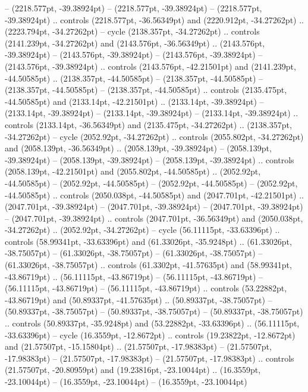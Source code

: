  -- (2218.577pt, -39.38924pt)
 -- (2218.577pt, -39.38924pt)
 -- (2218.577pt, -39.38924pt) .. controls (2218.577pt, -36.56349pt) and (2220.912pt, -34.27262pt) .. (2223.794pt, -34.27262pt) -- cycle
(2138.357pt, -34.27262pt) .. controls (2141.239pt, -34.27262pt) and (2143.576pt, -36.56349pt) .. (2143.576pt, -39.38924pt)
 -- (2143.576pt, -39.38924pt)
 -- (2143.576pt, -39.38924pt)
 -- (2143.576pt, -39.38924pt) .. controls (2143.576pt, -42.21501pt) and (2141.239pt, -44.50585pt) .. (2138.357pt, -44.50585pt)
 -- (2138.357pt, -44.50585pt)
 -- (2138.357pt, -44.50585pt)
 -- (2138.357pt, -44.50585pt) .. controls (2135.475pt, -44.50585pt) and (2133.14pt, -42.21501pt) .. (2133.14pt, -39.38924pt)
 -- (2133.14pt, -39.38924pt)
 -- (2133.14pt, -39.38924pt)
 -- (2133.14pt, -39.38924pt) .. controls (2133.14pt, -36.56349pt) and (2135.475pt, -34.27262pt) .. (2138.357pt, -34.27262pt) -- cycle
(2052.92pt, -34.27262pt) .. controls (2055.802pt, -34.27262pt) and (2058.139pt, -36.56349pt) .. (2058.139pt, -39.38924pt)
 -- (2058.139pt, -39.38924pt)
 -- (2058.139pt, -39.38924pt)
 -- (2058.139pt, -39.38924pt) .. controls (2058.139pt, -42.21501pt) and (2055.802pt, -44.50585pt) .. (2052.92pt, -44.50585pt)
 -- (2052.92pt, -44.50585pt)
 -- (2052.92pt, -44.50585pt)
 -- (2052.92pt, -44.50585pt) .. controls (2050.038pt, -44.50585pt) and (2047.701pt, -42.21501pt) .. (2047.701pt, -39.38924pt)
 -- (2047.701pt, -39.38924pt)
 -- (2047.701pt, -39.38924pt)
 -- (2047.701pt, -39.38924pt) .. controls (2047.701pt, -36.56349pt) and (2050.038pt, -34.27262pt) .. (2052.92pt, -34.27262pt) -- cycle
(56.11115pt, -33.63396pt) .. controls (58.99341pt, -33.63396pt) and (61.33026pt, -35.9248pt) .. (61.33026pt, -38.75057pt)
 -- (61.33026pt, -38.75057pt)
 -- (61.33026pt, -38.75057pt)
 -- (61.33026pt, -38.75057pt) .. controls (61.3302pt, -41.57635pt) and (58.99341pt, -43.86719pt) .. (56.11115pt, -43.86719pt)
 -- (56.11115pt, -43.86719pt)
 -- (56.11115pt, -43.86719pt)
 -- (56.11115pt, -43.86719pt) .. controls (53.22882pt, -43.86719pt) and (50.89337pt, -41.57635pt) .. (50.89337pt, -38.75057pt)
 -- (50.89337pt, -38.75057pt)
 -- (50.89337pt, -38.75057pt)
 -- (50.89337pt, -38.75057pt) .. controls (50.89337pt, -35.9248pt) and (53.22882pt, -33.63396pt) .. (56.11115pt, -33.63396pt) -- cycle
(16.3559pt, -12.8672pt) .. controls (19.23822pt, -12.8672pt) and (21.57507pt, -15.15804pt) .. (21.57507pt, -17.98383pt)
 -- (21.57507pt, -17.98383pt)
 -- (21.57507pt, -17.98383pt)
 -- (21.57507pt, -17.98383pt) .. controls (21.57507pt, -20.80959pt) and (19.23816pt, -23.10044pt) .. (16.3559pt, -23.10044pt)
 -- (16.3559pt, -23.10044pt)
 -- (16.3559pt, -23.10044pt)
